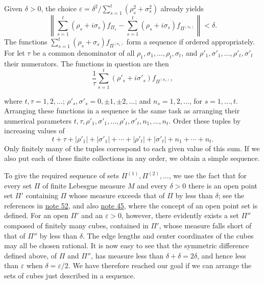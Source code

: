 \documentclass[fontsize=13pt,twoside,openany,headings=normal,parskip=false,bookmarkpackage=false,DIV=calc]{scrbook}
\begin{document}
Given $\delta>0$, the choice $\varepsilon=\delta^2/\sum_{s=1}^t(\rho_s^2+\sigma_s^2)$ already yields
\[
\left\|\sum_{s=1}^t(\rho_s+i\sigma_s)f_{\Pi_s}-\sum_{s=1}^t(\rho_s+i\sigma_s)f_{\Pi^{(n_s)}}\right\|<\delta.
\]
The functions $\sum_{s=1}^t(\rho_s+\sigma_s)f_{\Pi^{(n_s)}}$ form a sequence if ordered appropriately. For let $\tau$ be a common denominator of all $\rho_1,\sigma_1,\ldots,\rho_t,\sigma_t$, and $\rho'_1,\sigma'_1,\ldots,\rho'_t,\sigma'_t$ their numerators. The functions in question are then
\[
\frac1\tau\sum_{s=1}^t(\rho'_s+i\sigma'_s)f_{\Pi^{(n_s)}},
\]

\hypertarget{origpage-36}{}%
where $t,\tau=1,2,\ldots$; $\rho'_s,\sigma'_s=0,\pm1,\pm2,\ldots$; and $n_s=1,2,\ldots$, for $s=1,\ldots,t$. Arranging these functions in a sequence is the same task as arranging their numerical parameters $t,\tau,\rho'_1,\sigma'_1,\ldots,\rho'_t,\sigma'_t,n_1,\ldots,n_t$. Order these tuples by increasing values of
\[
t+\tau+|\rho'_1|+|\sigma'_1|+\cdots+|\rho'_t|+|\sigma'_t|+n_1+\cdots+n_t.
\]
Only finitely many of the tuples correspond to each given value of this sum. If we also put each of these finite collections in any order, we obtain a simple sequence.

To give the required sequence of sets $\Pi^{(1)},\Pi^{(2)},\ldots$, we use the fact that for every set $\Pi$ of finite Lebesgue measure $M$ and every $\delta>0$ there is an open point set $\Pi'$ containing $\Pi$ whose measure exceeds that of $\Pi$ by less than $\delta$; see the references in \hyperlink{note-52}{note 52}, and also \hyperlink{note-45}{note 45}, where the concept of an open point set is defined. For an open $\Pi'$ and an $\varepsilon>0$, however, there evidently exists a set $\Pi''$ composed of finitely many cubes, contained in $\Pi'$, whose measure falls short of that of $\Pi''$ by less than $\delta$. The edge lengths and center coordinates of the cubes may all be chosen rational. It is now easy to see that the symmetric difference defined above, of $\Pi$ and $\Pi''$, has measure less than $\delta+\delta=2\delta$, and hence less than $\varepsilon$ when $\delta=\varepsilon/2$. We have therefore reached our goal if we can arrange the sets of cubes just described in a sequence.
\end{document}
